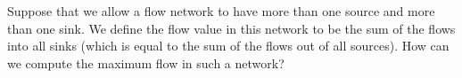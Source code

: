 Suppose that we allow a flow network to have more than one source and
more than one sink.  We define the flow value in this network to be the
sum of the flows into all sinks (which is equal to the sum of the flows
out of all sources).  How can we compute the maximum flow in such a network?


